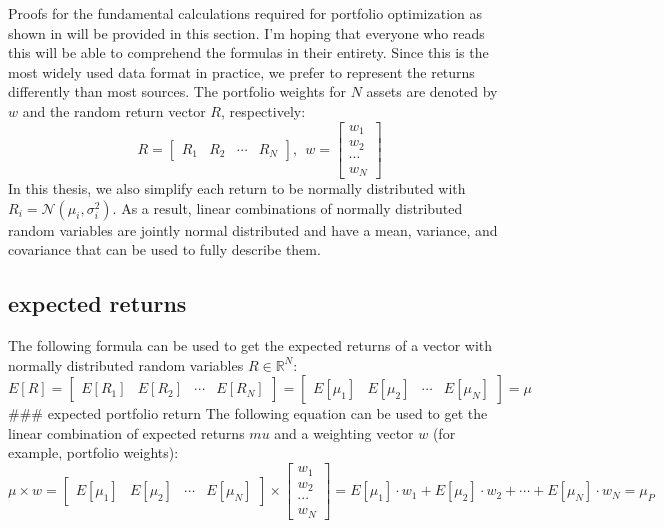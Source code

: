 \documentclass[
  oneside]{book}
\begin{document}
Proofs for the fundamental calculations required for portfolio optimization as shown in \citep{Eric2021} will be provided in this section. I'm hoping that everyone who reads this will be able to comprehend the formulas in their entirety. Since this is the most widely used data format in practice, we prefer to represent the returns differently than most sources. The portfolio weights for \(N\) assets are denoted by \(w\) and the random return vector \(R\), respectively:
\[
  R = 
  \begin{bmatrix}
    R_{1} & R_{2} & \cdots & R_{N}  
 \end{bmatrix}
 , \ \ 
 w = 
  \begin{bmatrix}
    w_{1} \\ 
    w_{2} \\
    \cdots \\
    w_{N}  
 \end{bmatrix}
\]
In this thesis, we also simplify each return to be normally distributed with \(R_i = \mathcal{N}(\mu_i, \sigma_i^2)\). As a result, linear combinations of normally distributed random variables are jointly normal distributed and have a mean, variance, and covariance that can be used to fully describe them.

\hypertarget{expected-returns}{%
\subsection{expected returns}\label{expected-returns}}

The following formula can be used to get the expected returns of a vector with normally distributed random variables \(R \in \mathbb{R}^{N}\):
\[
  E[R] =
  \begin{bmatrix}
    E[R_{1}] & E[R_{2}] & \cdots & E[R_{N}]  
 \end{bmatrix}
 =
 \begin{bmatrix}
    E[\mu_{1}] & E[\mu_{2}] & \cdots & E[\mu_{N}]  
 \end{bmatrix}
 =
 \mu
\]
\#\#\# expected portfolio return
The following equation can be used to get the linear combination of expected returns \(mu\) and a weighting vector \(w\) (for example, portfolio weights):
\[
 \mu \times w =
  \begin{bmatrix}
    E[\mu_{1}] & E[\mu_{2}] & \cdots & E[\mu_{N}]
 \end{bmatrix}
  \times 
  \begin{bmatrix}
    w_{1} \\ 
    w_{2} \\
    \cdots \\
    w_{N}  
 \end{bmatrix}
 =
 E[\mu_{1}] \cdot w_1 + E[\mu_{2}] \cdot w_2 + \cdots + E[\mu_{N}] \cdot w_{N} 
 =
 \mu_P
\]
\end{document}
